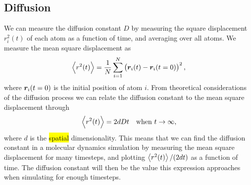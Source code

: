 \subsection{Diffusion}
We can measure the diffusion constant $D$ by measuring the square displacement $r_i^2(t)$ of each atom as a function of time, and averaging over all atoms. We measure the mean square displacement as
\begin{align*}
    \Braket{r^2(t)} = \frac{1}{N} \sum_{i=1}^N \left( \boldsymbol{r}_i(t) - \boldsymbol{r}_i(t=0) \right)^2,
\end{align*}
where $\boldsymbol{r}_i(t=0)$ is the initial position of atom $i$. From theoretical considerations of the diffusion process we can relate the diffusion constant to the mean square displacement through\cite[Section~4.4.1]{frenkel2001understanding}
\begin{align*}
    &\Braket{r^2(t)} = 2dDt &\text{when }t\rightarrow \infty,
\end{align*}
where $d$ is the \hl{spatial} dimensionality. This means that we can find the diffusion constant in a molecular dynamics simulation by measuring the mean square displacement for many timesteps, and plotting $\Braket{r^2(t)}/(2dt)$ as a function of time. The diffusion constant will then be the value this expression approaches when simulating for enough timesteps.

